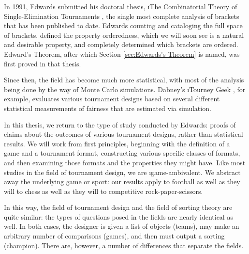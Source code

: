 {       %


    In 1991, Edwards submitted his doctoral thesis, \i{The Combinatorial Theory of Single-Elimination Tournaments} \cite{montana}, the single most complete analysis of brackets that has been published to date. Edwards counting and cataloging the full space of brackets, defined the property orderedness, which we will soon see is a natural and desirable property, and completely determined which brackets are ordered. Edward's Theorem, after which Section \ref{sec:Edwards's Theorem} is named, was first proved in that thesis.

    Since then, the field has become much more statistical, with most of the analysis being done by the way of Monte Carlo simulations. Dabney's \i{Tourney Geek} \cite{geek}, for example, evaluates various tournament designs based on several different statistical measurements of fairness that are estimated via simulation.
    
    In this thesis, we return to the type of study conducted by Edwards: proofs of claims about the outcomes of various tournament designs, rather than statistical results. We will work from first principles, beginning with the definition of a game and a tournament format, constructing various specific classes of formats, and then examining those formats and the properties they might have. Like most studies in the field of tournament design, we are \i{game-ambivalent}. We abstract away the underlying game or sport: our results apply to football as well as they will to chess as well as they will to competitive rock-paper-scissors.

    In this way, the field of tournament design and the field of sorting theory are quite similar: the types of questions posed in the fields are nearly identical as well. In both cases, the designer is given a list of objects (teams), may make an arbitrary number of comparisons (games), and then must output a sorting (champion). There are, however, a number of differences that separate the fields.

}
